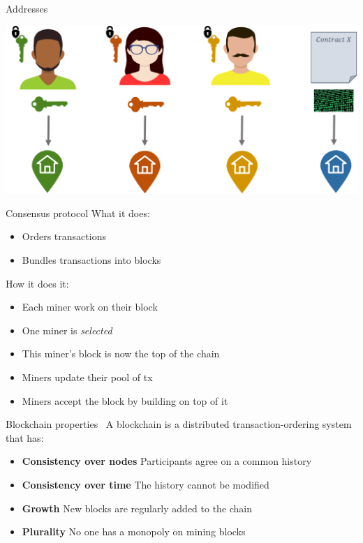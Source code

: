 \begin{frame}{Addresses}
    \begin{center}
        \includegraphics[scale=0.36]{Figures/BC_address.png}
    \end{center}
\end{frame}


\begin{frame}{Consensus protocol}
What it does:
    \begin{itemize}
        \item Orders transactions
        \item Bundles transactions into blocks
    \end{itemize}
\bigskip    
How it does it:
    \begin{itemize}
        \item Each miner work on \alert{their} block
        \item \alert{One} miner is \emph{selected}
        \item This miner's block is now the top of the chain
        \item Miners update their pool of tx 
        \item Miners accept the block by building on top of it
    \end{itemize}
\end{frame}

\begin{frame}{Blockchain properties~\cite{pass2016analysis}}
A blockchain is a \alert{distributed} transaction-ordering system that has: 
    \begin{itemize}
        \item \textbf{Consistency over nodes} \newline Participants agree on a common history
        \item \textbf{Consistency over time} \newline The history cannot be modified
        \item \textbf{Growth} \newline New blocks are regularly added to the chain 
        \item \textbf{Plurality} \newline No one has a monopoly on mining blocks
    \end{itemize}
\end{frame}

